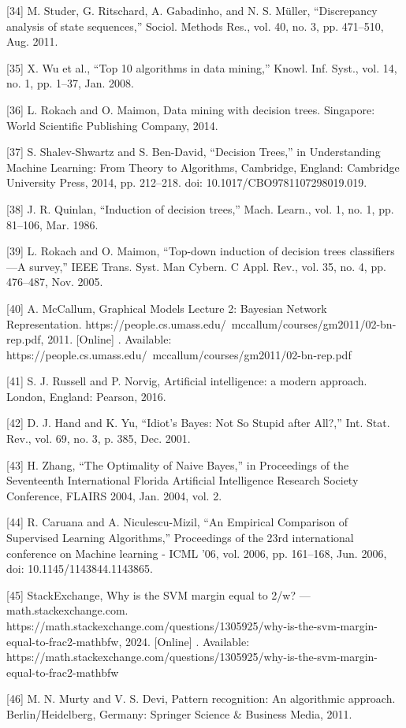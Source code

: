 \documentclass[sn-mathphys-num]{sn-jnl}%
\begin{document}
[34] M. Studer, G. Ritschard, A. Gabadinho, and N. S. Müller, “Discrepancy analysis of state sequences,” Sociol. Methods Res., vol. 40, no. 3, pp. 471–510, Aug. 2011.

[35] X. Wu et al., “Top 10 algorithms in data mining,” Knowl. Inf. Syst., vol. 14, no. 1, pp. 1–37, Jan. 2008.

[36] L. Rokach and O. Maimon, Data mining with decision trees. Singapore: World Scientific Publishing Company, 2014.

[37] S. Shalev-Shwartz and S. Ben-David, “Decision Trees,” in Understanding Machine Learning: From Theory to Algorithms, Cambridge, England: Cambridge University Press, 2014, pp. 212–218. doi: 10.1017/CBO9781107298019.019.

[38] J. R. Quinlan, “Induction of decision trees,” Mach. Learn., vol. 1, no. 1, pp. 81–106, Mar. 1986.

[39] L. Rokach and O. Maimon, “Top-down induction of decision trees classifiers—A survey,” IEEE Trans. Syst. Man Cybern. C Appl. Rev., vol. 35, no. 4, pp. 476–487, Nov. 2005.

[40] A. McCallum, Graphical Models Lecture 2: Bayesian Network Representation. https://people.cs.umass.edu/ mccallum/courses/gm2011/02-bn-rep.pdf, 2011. [Online] . Available: https://people.cs.umass.edu/ mccallum/courses/gm2011/02-bn-rep.pdf

[41] S. J. Russell and P. Norvig, Artificial intelligence: a modern approach. London, England: Pearson, 2016.

[42] D. J. Hand and K. Yu, “Idiot’s Bayes: Not So Stupid after All?,” Int. Stat. Rev., vol. 69, no. 3, p. 385, Dec. 2001.

[43] H. Zhang, “The Optimality of Naive Bayes,” in Proceedings of the Seventeenth International Florida Artificial Intelligence Research Society Conference, FLAIRS 2004, Jan. 2004, vol. 2.

[44] R. Caruana and A. Niculescu-Mizil, “An Empirical Comparison of Supervised Learning Algorithms,” Proceedings of the 23rd international conference on Machine learning - ICML ’06, vol. 2006, pp. 161–168, Jun. 2006, doi: 10.1145/1143844.1143865.

[45] StackExchange, Why is the SVM margin equal to 2/w? — math.stackexchange.com. https://math.stackexchange.com/questions/1305925/why-is-the-svm-margin-equal-to-frac2-mathbfw, 2024. [Online] . Available: https://math.stackexchange.com/questions/1305925/why-is-the-svm-margin-equal-to-frac2-mathbfw

[46] M. N. Murty and V. S. Devi, Pattern recognition: An algorithmic approach. Berlin/Heidelberg, Germany: Springer Science & Business Media, 2011.
\end{document}
